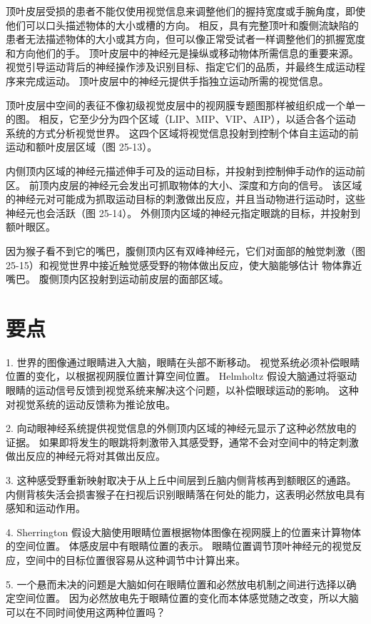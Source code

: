 顶叶皮层受损的患者不能仅使用视觉信息来调整他们的握持宽度或手腕角度，即使他们可以口头描述物体的大小或槽的方向。
相反，具有完整顶叶和腹侧流缺陷的患者无法描述物体的大小或其方向，但可以像正常受试者一样调整他们的抓握宽度和方向他们的手。
顶叶皮层中的神经元是操纵或移动物体所需信息的重要来源。
视觉引导运动背后的神经操作涉及识别目标、指定它们的品质，并最终生成运动程序来完成运动。
顶叶皮层中的神经元提供手指独立运动所需的视觉信息。


顶叶皮层中空间的表征不像初级视觉皮层中的视网膜专题图那样被组织成一个单一的图。
相反，它至少分为四个区域（LIP、MIP、VIP、AIP），以适合各个运动系统的方式分析视觉世界。
这四个区域将视觉信息投射到控制个体自主运动的前运动和额叶皮层区域（图 25-13）。


内侧顶内区域的神经元描述伸手可及的运动目标，并投射到控制伸手动作的运动前区。
前顶内皮层的神经元会发出可抓取物体的大小、深度和方向的信号。
该区域的神经元对可能成为抓取运动目标的刺激做出反应，并且当动物进行运动时，这些神经元也会活跃（图 25-14）。
外侧顶内区域的神经元指定眼跳的目标，并投射到额叶眼区。


因为猴子看不到它的嘴巴，腹侧顶内区有双峰神经元，它们对面部的触觉刺激（图 25-15）和视觉世界中接近触觉感受野的物体做出反应，使大脑能够估计 物体靠近嘴巴。
腹侧顶内区投射到运动前皮层的面部区域。




\section{要点}

1. 世界的图像通过眼睛进入大脑，眼睛在头部不断移动。
视觉系统必须补偿眼睛位置的变化，以根据视网膜位置计算空间位置。
Helmholtz 假设大脑通过将驱动眼睛的运动信号反馈到视觉系统来解决这个问题，以补偿眼球运动的影响。
这种对视觉系统的运动反馈称为推论放电。


2. 向动眼神经系统提供视觉信息的外侧顶内区域的神经元显示了这种必然放电的证据。
如果即将发生的眼跳将刺激带入其感受野，通常不会对空间中的特定刺激做出反应的神经元将对其做出反应。


3. 这种感受野重新映射取决于从上丘中间层到丘脑内侧背核再到额眼区的通路。
内侧背核失活会损害猴子在扫视后识别眼睛落在何处的能力，这表明必然放电具有感知和运动作用。


4. Sherrington 假设大脑使用眼睛位置根据物体图像在视网膜上的位置来计算物体的空间位置。
体感皮层中有眼睛位置的表示。
眼睛位置调节顶叶神经元的视觉反应，空间中的目标位置很容易从这种调节中计算出来。


5. 一个悬而未决的问题是大脑如何在眼睛位置和必然放电机制之间进行选择以确定空间位置。
因为必然放电先于眼睛位置的变化而本体感觉随之改变，所以大脑可以在不同时间使用这两种位置吗？


